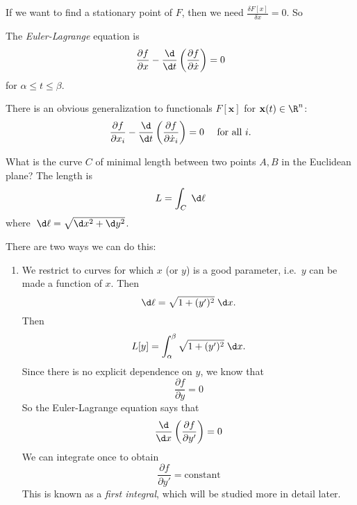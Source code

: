 \documentclass[a4paper]{article}
\begin{document}
If we want to find a stationary point of $F$, then we need $\frac{\delta F[x]}{\delta x} = 0$. So
\begin{defi}
  The \emph{Euler-Lagrange} equation is
  \[
    \frac{\partial f}{\partial x} - \frac{\d}{\d t}\left(\frac{\partial f}{\partial \dot{x}}\right) = 0
  \]
  for $\alpha \leq t \leq \beta$.
\end{defi}
There is an obvious generalization to functionals $F[\mathbf{x}]$ for $\mathbf{x}(t) \in \R^n$:
\[
  \frac{\partial f}{\partial x_i} - \frac{\d }{\d t}\left(\frac{\partial f}{\partial \dot{x}_i}\right) = 0 \quad\text{ for all }i.
\]
\begin{eg}
  What is the curve $C$ of minimal length between two points $A, B$ in the Euclidean plane? The length is
  \[
    L = \int_C \;\d \ell
  \]
  where $\;\d \ell = \sqrt{\d x^2 + \d y^2}$.

  There are two ways we can do this:
  \begin{enumerate}
    \item We restrict to curves for which $x$ (or $y$) is a good parameter, i.e.\ $y$ can be made a function of $x$. Then
      \[
        \d \ell = \sqrt{1 + (y')^2}\;\d x.
      \]
      Then
      \[
        L[y] = \int_\alpha^\beta \sqrt{1 + (y')^2}\;\d x.
      \]
      Since there is no explicit dependence on $y$, we know that
      \[
        \frac{\partial f}{\partial y} = 0
      \]
      So the Euler-Lagrange equation says that
      \[
        \frac{\d}{\d x} \left(\frac{\partial f}{\partial y'}\right) = 0
      \]
      We can integrate once to obtain
      \[
        \frac{\partial f}{\partial y'} = \text{constant}
      \]
      This is known as a \emph{first integral}, which will be studied more in detail later.


\end{enumerate}
\end{eg}
\end{document}
